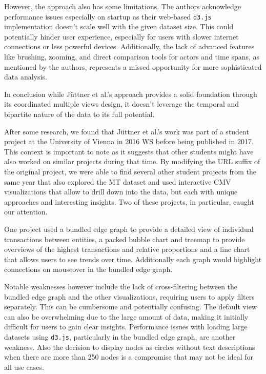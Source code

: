 \documentclass{vgtc}                          %
\begin{document}
However, the approach also has some limitations. The authors acknowledge performance issues especially on startup as their web-based \texttt{d3.js} implementation doesn't scale well with the given dataset size. This could potentially hinder user experience, especially for users with slower internet connections or less powerful devices. Additionally, the lack of advanced features like brushing, zooming, and direct comparison tools for actors and time spans, as mentioned by the authors, represents a missed opportunity for more sophisticated data analysis.

In conclusion while Jüttner et al.'s approach provides a solid foundation through its coordinated multiple views design, it doesn't leverage the temporal and bipartite nature of the data to its full potential.

\medskip

After some research, we found that Jüttner et al.'s work was part of a student project at the University of Vienna in 2016 WS \cite{univie10} before being published in 2017. This context is important to note as it suggests that other students might have also worked on similar projects during that time. By modifying the URL suffix of the original project, we were able to find several other student projects from the same year that also explored the MT dataset and used interactive CMV visualizations that allow to drill down into the data, but each with unique approaches and interesting insights. Two of these projects, in particular, caught our attention.

\medskip

One project \cite{univie03} used a bundled edge graph to provide a detailed view of individual transactions between entities, a packed bubble chart and treemap to provide overviews of the highest transactions and relative proportions and a line chart that allows users to see trends over time. Additionally each graph would highlight connections on mouseover in the bundled edge graph.

Notable weaknesses however include the lack of cross-filtering between the bundled edge graph and the other visualizations, requiring users to apply filters separately. This can be cumbersome and potentially confusing. The default view can also be overwhelming due to the large amount of data, making it initially difficult for users to gain clear insights. Performance issues with loading large datasets using \texttt{d3.js}, particularly in the bundled edge graph, are another weakness. Also the decision to display nodes as circles without text descriptions when there are more than 250 nodes is a compromise that may not be ideal for all use cases.
\end{document}
